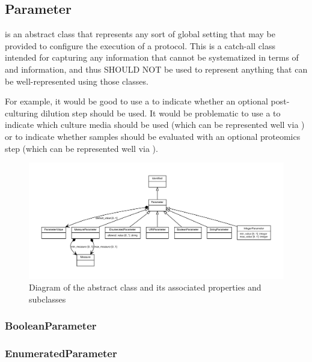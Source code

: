 \subsection{Parameter}
\label{sec:Parameter}

 is an abstract class that represents any sort of global setting that may be provided to configure the execution of a protocol.
This is a catch-all class intended for capturing any information that cannot be systematized in terms of  and  information, and thus SHOULD NOT be used to represent anything that can be well-represented using those classes.

For example, it would be good to use a  to indicate whether an optional post-culturing dilution step should be used.
It would be problematic to use a  to indicate which culture media should be used (which can be represented well via ) or to indicate whether samples should be evaluated with an optional proteomics step (which can be represented well via ).


\begin{figure}[ht]
\begin{center}
\includegraphics[scale=0.6]{figures/Parameter_definition_and_abstraction}
\caption[]{Diagram of the  abstract class and its associated properties and subclasses}
\label{uml:Parameter}
\end{center}
\end{figure}

\subsubsection{BooleanParameter}
\label{sec:BooleanParameter}


\subsubsection{EnumeratedParameter}
\label{sec:EnumeratedParameter}

